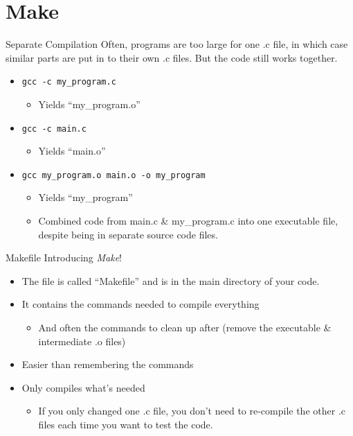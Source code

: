 \documentclass[graphics]{beamer}
\begin{document}
\section{Make}
\begin{frame}{Separate Compilation}
    Often, programs are too large for one .c file, in which case similar parts are put in to their own .c files. But the code still works together.
    \begin{itemize}
        \item \texttt{gcc -c my\_program.c}
        \begin{itemize}
            \item Yields ``my\_program.o''
        \end{itemize}
        \item \texttt{gcc -c main.c}
        \begin{itemize}
            \item Yields ``main.o''
        \end{itemize}
        \item \texttt{gcc my\_program.o main.o -o my\_program}
        \begin{itemize}
            \item Yields ``my\_program''
            \item Combined code from main.c \& my\_program.c into one executable file, despite being in separate source code files.
        \end{itemize}
    \end{itemize}
\end{frame}

\begin{frame}{Makefile}
    Introducing \textit{Make}!
    \begin{itemize}
        \item The file is called ``Makefile'' and is in the main directory of your code.
        \item It contains the commands needed to compile everything
        \begin{itemize}
            \item And often the commands to clean up after (remove the executable \& intermediate .o files)
        \end{itemize}
        \item Easier than remembering the commands
        \item Only compiles what's needed
        \begin{itemize}
            \item If you only changed one .c file, you don't need to re-compile the other .c files each time you want to test the code.
        \end{itemize}
    \end{itemize}
\end{frame}
\end{document}
